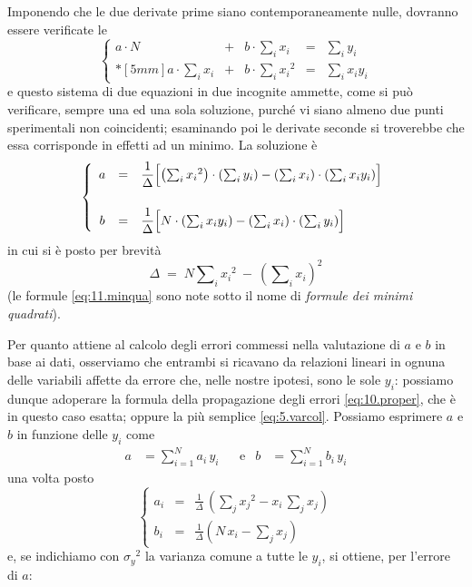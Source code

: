 Imponendo che le due derivate prime siano contemporaneamente
nulle, dovranno essere verificate le
\begin{equation} \label{eq:11.normeq}
  \left \{ \begin{array}{ccccl}
    a \cdot N & + & b \cdot \sum_i x_i &
      = & \sum_i y_i \\*[5mm]
    a \cdot \sum_i x_i & + & b \cdot \sum_i {x_i}^2
      & = & \sum_i x_i y_i
    \end{array} \right.
\end{equation}
e questo sistema di due equazioni in due incognite ammette,
come si pu\`o verificare, sempre una ed una sola soluzione,
purch\'e vi siano almeno due punti sperimentali non
coincidenti; esaminando poi le derivate seconde si
troverebbe che essa corrisponde in effetti ad un minimo.  La
soluzione \`e
\begin{equation}%
  \label{eq:11.minqua}%
  \index{minimi quadrati, formule dei|emidx}
  \left \{
    \begin{array}{ccl}
      a & = & \dfrac{1}{\Delta}
        \Bigl[ \left( \sum_{i} {x_i}^2 \right) \cdot
        \left( \sum_i y_i \right) -
        \left( \sum_i x_i \right) \cdot
        \left( \sum_i x_i y_i \right) \Bigr] \\*[7mm]
      b & = & \dfrac{1}{\Delta}
        \Bigl[ N \cdot \left( \sum_i x_i y_i \right) -
        \left( \sum_i x_i \right) \cdot
        \left( \sum_i y_i \right)
        \Bigr]
    \end{array}
  \right.
\end{equation}
in cui si \`e posto per brevit\`a
\begin{equation*}
  \Delta \; = \; N \sum \nolimits_i {x_i}^2 \: - \:
  \left( \sum \nolimits_i x_i \right) ^2
\end{equation*}
(le formule \eqref{eq:11.minqua} sono note sotto il nome di
\emph{formule dei minimi quadrati}).

Per quanto attiene al calcolo degli errori commessi nella
valutazione di $a$ e $b$ in base ai dati, osserviamo che
entrambi si ricavano da relazioni lineari in ognuna delle
variabili affette da errore che, nelle nostre ipotesi, sono
le sole $ y_i$: possiamo dunque adoperare la formula della
propagazione degli errori \eqref{eq:10.proper}, che \`e in
questo caso esatta; oppure la pi\`u semplice
\eqref{eq:5.varcol}.  Possiamo esprimere $a$ e $b$ in
funzione delle $y_i$ come
\begin{align*}
  a &= \sum_{i=1}^N a_i \, y_i &&\text{e} &
  b &= \sum_{i=1}^N b_i \, y_i
\end{align*}
una volta posto
\begin{equation*}
  \left\{
    \begin{array}{rcl}
      a_i & = & \displaystyle \frac{1}{\Delta} \,
        \left( \sum\nolimits_j {x_j}^2 - x_i \,
        \sum\nolimits_j x_j \right) \\[3ex]
      b_i & = & \displaystyle \frac{1}{\Delta} \left(
        N \, x_i - \sum\nolimits_j x_j \right)
    \end{array}
  \right.
\end{equation*}
e, se indichiamo con ${\sigma_y}^2$ la varianza comune a
tutte le $y_i$, si ottiene, per l'errore di $a$:

